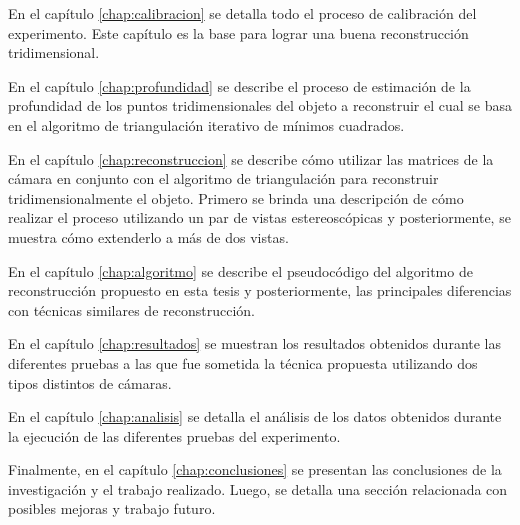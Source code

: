 En el cap\'{i}tulo \ref{chap:calibracion} se detalla todo el proceso de calibraci\'{o}n del experimento. Este cap\'{i}tulo es la base para lograr una buena reconstrucci\'{o}n tridimensional.

En el cap\'{i}tulo \ref{chap:profundidad} se describe el proceso de estimaci\'{o}n de la profundidad de los puntos tridimensionales del objeto a reconstruir el cual se basa en el algoritmo de triangulaci\'{o}n iterativo de m\'{i}nimos cuadrados.

En el cap\'{i}tulo \ref{chap:reconstruccion} se describe c\'{o}mo utilizar las matrices de la c\'{a}mara en conjunto con el algoritmo de triangulaci\'{o}n para reconstruir tridimensionalmente el objeto. Primero se brinda una descripci\'{o}n de c\'{o}mo realizar el proceso utilizando un par de vistas estereosc\'{o}picas y posteriormente, se muestra c\'{o}mo extenderlo a m\'{a}s de dos vistas.

En el cap\'{i}tulo \ref{chap:algoritmo} se describe el pseudoc\'{o}digo del algoritmo de reconstrucci\'{o}n propuesto en esta tesis y posteriormente, las principales diferencias con t\'{e}cnicas similares de reconstrucci\'{o}n.


En el cap\'{i}tulo \ref{chap:resultados} se muestran los resultados obtenidos durante las diferentes pruebas a las que fue sometida la t\'{e}cnica propuesta utilizando dos tipos distintos de c\'{a}maras.

En el cap\'{i}tulo \ref{chap:analisis} se detalla el an\'{a}lisis de los datos obtenidos durante la ejecuci\'{o}n de las diferentes pruebas del experimento.

Finalmente, en el cap\'{i}tulo \ref{chap:conclusiones} se presentan las conclusiones de la investigaci\'{o}n y el trabajo realizado. Luego, se detalla una secci\'{o}n relacionada con posibles mejoras y trabajo futuro.


